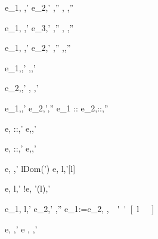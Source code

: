   {e_1,\hat{\sigma}\hat{\eval} \True,\hat{\sigma}'\Quad
   e_2,\hat{\sigma}'\hat{\eval} ,\hat{\sigma}''}
  {,\hat{\sigma}\hat{\eval} ,\hat{\sigma}''}

  {e_1,\hat{\sigma}\hat{\eval} ,\hat{\sigma}' \Quad
   e_3,\hat{\sigma}'\hat{\eval} ,\hat{\sigma}''}
  {,\hat{\sigma}\hat{\eval} ,\hat{\sigma}''}


  {e_1,\hat{\sigma}\hat{\eval} ,\hat{\sigma}' \Quad
   e_2,\hat{\sigma}'\hat{\eval} ,\hat{\sigma}''}
  {,\hat{\sigma}\hat{\eval},\hat{\sigma}''}

  {e_1,\hat{\sigma}\hat{\eval},\hat{\sigma}'}
  {\Fst{},\hat{\sigma}\hat{\eval},\hat{\sigma}'}

  {e_2,\hat{\sigma}\hat{\eval},\hat{\sigma}'}
  {\Snd{},\hat{\sigma}\hat{\eval} ,\hat{\sigma}' }


  {e_1,\hat{\sigma}\hat{\eval},\hat{\sigma}'\Quad
   e_2,\hat{\sigma}'\hat{\eval},\hat{\sigma}''}
  {e_1 :: e_2,\hat{\sigma}\hat{\eval}::,\hat{\sigma}''}

  {e,\hat{\sigma}\hat{\eval} ::,\hat{\sigma}'}
  {\Head e,\hat{\sigma}\hat{\eval},\hat{\sigma}'}

{e,\hat{\sigma}\hat{\eval} ::,\hat{\sigma}'}
{\Tail e,\hat{\sigma}\hat{\eval},\hat{\sigma}'}



  {e,\hat{\sigma}\hat{\eval} ,\hat{\sigma}' \Quad
   l\not\in Dom(\hat{\sigma}')}
  {\Ref e,\hat{\sigma}\hat{\eval} l,\hat{\sigma}'[l\mapsto {}]}

  {e,\hat{\sigma}\hat{\eval} l,\hat{\sigma}'}
  {!e,\hat{\sigma}\hat{\eval} \hat{\sigma}'(l),\hat{\sigma}'}

  {e_1,\hat{\sigma}\hat{\eval} l,\hat{\sigma}' \Quad
   e_2,\hat{\sigma}'\hat{\eval} ,\hat{\sigma}''}
  {e_1:=e_2,\hat{\sigma}\hat{\eval} \unit,\hat{\sigma}''[l\mapsto {}]}

  {e,\hat{\sigma} \hat{\eval} ,\hat{\sigma}'}
  {\Edit e , \hat{\sigma}\hat{\eval} \Edit {},\hat{\sigma}'}

